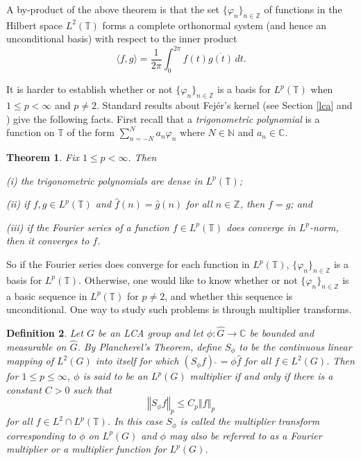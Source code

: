 \documentclass[12pt]{UNSWthesis}
\newcommand{\C}{\mathbb{C}}
\newcommand{\N}{\mathbb{N}}
\newcommand{\T}{\mathbb{T}}
\newcommand{\Z}{\mathbb{Z}}
\newcommand{\hatt}[1]{\widehat #1}
\def\ip<#1,#2>{\langle #1,#2 \rangle}
\def\norm#1{\left \Vert #1 \right \Vert}
\newtheorem{theorem}{Theorem}[section]
\newtheorem{definition}[theorem]{Definition}
\numberwithin{equation}{section}
\begin{document}
A by-product of the above theorem is that the set $\{\varphi_n\}_{n\in\Z}$ of
functions in the Hilbert space $L^2(\T)$ forms a complete orthonormal system 
(and
hence an unconditional basis) with respect to the inner product
\[\ip<f,g>=\frac{1}{2\pi}\int_0^{2\pi}f(t)\overline{g(t)}\,dt.\]

It is harder to establish whether or not $\{\varphi_n\}_{n\in\Z}$ is a basis for
$L^p(\T)$ when $1\leq p<\infty$ and $p\neq2$. Standard results about Fej\'{e}r's
kernel (see Section \ref{lca} and \cite[I.2.6]{Katznelson}) give the following
facts. First recall that a {\em trigonometric polynomial} is a function on 
$\T$ of 
the form $\sum_{n=-N}^Na_n\varphi_n$ where $N\in\N$ and $a_n\in\C$.

\begin{theorem}\label{Fejer facts}
Fix $1\leq p<\infty$. Then

(i) the trigonometric polynomials are dense in $L^p(\T)$;

(ii) if $f,g\in L^p(\T)$ and $\hatt{f}(n)=\hatt{g}(n)$ for all $n\in\Z$,
then $f=g$; and


(iii) if the Fourier series of a function $f\in L^p(\T)$ does converge in
$L^p$-norm, then it converges to $f$.
\end{theorem}

So if the Fourier series does converge for each function in $L^p(\T)$,
$\{\varphi_n\}_{n\in\Z}$ is a basis for $L^p(\T)$. Otherwise,
one would like to know whether or not $\{\varphi_n\}_{n\in\Z}$ is a basic 
sequence in $L^p(\T)$ for $p\neq2$, and whether this sequence is unconditional.
One way to study such problems is through multiplier transforms.

\begin{definition}\label{multipliers}
Let $G$ be an LCA group and let
$\phi:\hatt{G}\rightarrow\C$ be bounded and measurable on $\hatt{G}$. By
Plancherel's Theorem, define $S_{\phi}$ to be the continuous linear mapping of
$L^2(G)$ into itself for which
$({S_{\phi}f})\,\hatt{\,} = \phi \hatt{f}$ for all $f\in L^2(G)$.
Then for $1\leq p\leq\infty$, $\phi$ is said to be an 
{\em $L^p(G)$ multiplier} if
and only if there is a constant $C>0$ such that
\begin{equation}\label{eq-multiplier norm}
\norm{S_{\phi}f}_p\leq C_p\norm{f}_p
\end{equation}
for all $f\in L^2\cap L^p(\T)$.
In this case $S_{\phi}$ is called the {\em multiplier transform corresponding
to $\phi$ on $L^p(G)$} and $\phi$ may also be referred to as a
{\em Fourier multiplier} or a {\em multiplier function} for $L^p(G)$.
\end{definition}
\end{document}
